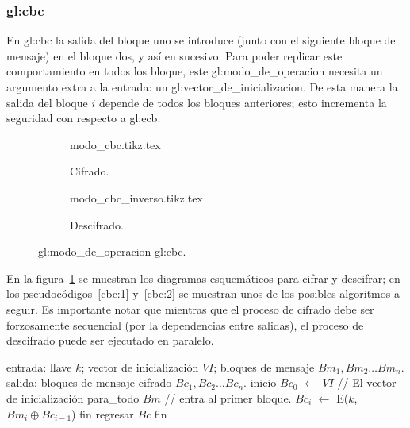 %
%

\subsubsection{\texorpdfstring{\acrfull{gl:cbc}}{Cipher-block Chaining (CBC)}}
\label{sec:cbc}

En \gls{gl:cbc} la salida del bloque uno se introduce (junto con
el siguiente bloque del mensaje) en el bloque dos, y así en sucesivo.
Para poder replicar este comportamiento en todos los bloque, este
\gls{gl:modo_de_operacion} necesita un argumento extra a la entrada: un
\gls{gl:vector_de_inicializacion}. De esta manera la salida del bloque $ i $
depende de todos los bloques anteriores; esto incrementa la seguridad con
respecto a \gls{gl:ecb}.

\begin{figure}
  \centering
  \begin{subfigure}{0.45\textwidth}
    \begin{center}
      {modo_cbc.tikz.tex}
      \caption{Cifrado.}
    \end{center}
  \end{subfigure}
  \begin{subfigure}{0.45\textwidth}
    \begin{center}
      {modo_cbc_inverso.tikz.tex}
      \caption{Descifrado.}
    \end{center}
  \end{subfigure}
  \caption{\Gls{gl:modo_de_operacion} \acrshort{gl:cbc}.}
  \label{figura:cbc}
\end{figure}

En la figura~\ref{figura:cbc} se muestran los diagramas esquemáticos para
cifrar y descifrar; en los pseudocódigos~\ref{cbc:1} y~\ref{cbc:2} se muestran
unos de los posibles algoritmos a seguir. Es importante notar que mientras que
el proceso de cifrado debe ser forzosamente secuencial (por la dependencias
entre salidas), el proceso de descifrado puede ser ejecutado en paralelo.


\begin{pseudocodigo}[%
    caption={\Gls{gl:modo_de_operacion} \acrshort{gl:cbc}, cifrado.},
    label={cbc:1}%
  ]
    entrada: llave $ k $; vector de inicialización $ VI $;
             bloques de mensaje $ Bm_1, Bm_2 \dots Bm_n $.
    salida:  bloques de mensaje cifrado $ Bc_1, Bc_2 \dots Bc_n $.
    inicio
      $Bc_0$ $\gets$ $ VI $                        // El vector de inicialización
      para_todo $Bm$               // entra al primer bloque.
        $Bc_i$ $\gets$ E($k$, $Bm_i \oplus Bc_{i - 1}$)
      fin
      regresar $Bc$
    fin
\end{pseudocodigo}

